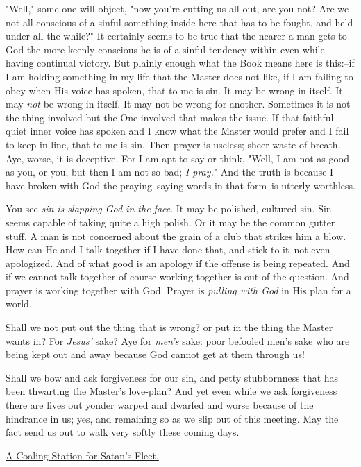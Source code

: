 "Well," some one will object, "now you're cutting us all out, are you not?
Are we not all conscious of a sinful something inside here that has to be
fought, and held under all the while?" It certainly seems to be true that
the nearer a man gets to God the more keenly conscious he is of a sinful
tendency within even while having continual victory. But plainly enough
what the Book means here is this:--if I am holding something in my life
that the Master does not like, if I am failing to obey when His voice has
spoken, that to me is sin. It may be wrong in itself. It may \textit{not} be
wrong in itself. It may not be wrong for another. Sometimes it is not the
thing involved but the One involved that makes the issue. If that faithful
quiet inner voice has spoken and I know what the Master would prefer and I
fail to keep in line, that to me is sin. Then prayer is useless; sheer
waste of breath. Aye, worse, it is deceptive. For I am apt to say or
think, "Well, I am not as good as you, or you, but then I am not so bad;
\textit{I pray.}" And the truth is because I have broken with God the
praying--saying words in that form--is utterly worthless.

You see \textit{sin is slapping God in the face}. It may be polished, cultured
sin. Sin seems capable of taking quite a high polish. Or it may be the
common gutter stuff. A man is not concerned about the grain of a club that
strikes him a blow. How can He and I talk together if I have done that,
and stick to it--not even apologized. And of what good is an apology if
the offense is being repeated. And if we cannot talk together of course
working together is out of the question. And prayer is working together
with God. Prayer is \textit{pulling with God} in His plan for a world.

Shall we not put out the thing that is wrong? or put in the thing the
Master wants in? For \textit{Jesus'} sake? Aye for \textit{men's} sake: poor befooled
men's sake who are being kept out and away because God cannot get at them
through us!

Shall we bow and ask forgiveness for our sin, and petty stubbornness that
has been thwarting the Master's love-plan? And yet even while we ask
forgiveness there are lives out yonder warped and dwarfed and worse
because of the hindrance in us; yes, and remaining so as we slip out of
this meeting. May the fact send us out to walk very softly these coming
days.



\underline{A Coaling Station for Satan's Fleet.}


